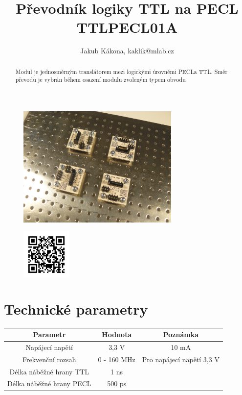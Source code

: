 \documentclass[12pt,a4paper,oneside]{article}
\begin{document}
\title{Převodník logiky TTL na PECL TTLPECL01A}
\author{Jakub Kákona, kaklik@mlab.cz}
\maketitle

\thispagestyle{empty}
\begin{abstract}
Modul je jednosměrným translátorem mezi logickými úrovněmi
PECLa TTL. Směr převodu je vybrán během osazení modulu zvoleným typem obvodu
\end{abstract}

\begin{figure} [htbp]
\begin{center}
\includegraphics [width=80mm] {./img/TTLPECL01A_Top_Big.JPG} 
\end{center}
\end{figure}

\begin{figure} [b]
\includegraphics [width=25mm] {./img/TTLPECL01A_QRcode.png} 
\end{figure}

\newpage
\tableofcontents


\section{Technické parametry}
\begin{table}[htbp]
\begin{center}
\begin{tabular}{|c|c|c|}
\hline
\multicolumn{1}{|c|}{Parametr} & \multicolumn{1}{|c|}{Hodnota} & \multicolumn{1}{|c|}{Poznámka} \\ \hline
Napájecí napětí & 3,3 V &  10 mA \\ \hline
Frekvenční rozsah  & 0 - 160 MHz & Pro napájecí napětí 3,3 V \\ \hline
Délka náběžné hrany TTL  & 1 ns & \\ \hline
Délka náběžné hrany PECL  & 500 ps & \\ \hline
\end{tabular}
\end{center}
\end{table}
\end{document}
